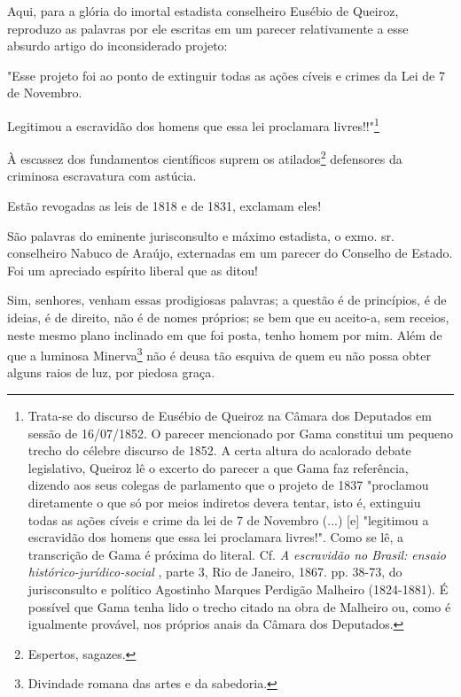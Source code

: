 Aqui, para a glória do imortal estadista conselheiro Eusébio de Queiroz,
reproduzo as palavras por ele escritas em um parecer relativamente a
esse absurdo artigo do inconsiderado projeto:

"Esse projeto foi ao ponto de extinguir todas as ações cíveis e crimes
da Lei de 7 de Novembro.

Legitimou a escravidão dos homens que essa lei proclamara
livres!!"\footnote{Trata-se do discurso de Eusébio de Queiroz na
  Câmara dos Deputados em sessão de 16/07/1852. O parecer mencionado por
  Gama constitui um pequeno trecho do célebre discurso de 1852. A certa
  altura do acalorado debate legislativo, Queiroz lê o excerto do
  parecer a que Gama faz referência, dizendo aos seus colegas de
  parlamento que o projeto de 1837 "proclamou diretamente o que só por
  meios indiretos devera tentar, isto é, extinguiu todas as ações cíveis
  e crime da lei de 7 de Novembro (...) {[}e{]} "legitimou a escravidão
  dos homens que essa lei proclamara livres!". Como se lê, a transcrição
  de Gama é próxima do literal. Cf. \emph{A escravidão no Brasil: ensaio
  histórico-jurídico-social} , parte 3, Rio de Janeiro, 1867. pp. 38-73,
  do jurisconsulto e político Agostinho Marques Perdigão Malheiro
  (1824-1881). É possível que Gama tenha lido o trecho citado na obra de
  Malheiro ou, como é igualmente provável, nos próprios anais da Câmara
  dos Deputados.}

À escassez dos fundamentos científicos suprem os atilados\footnote{
  Espertos, sagazes.} defensores da criminosa escravatura com astúcia.

Estão revogadas as leis de 1818 e de 1831, exclamam eles!

São palavras do eminente jurisconsulto e máximo estadista, o exmo. sr.
conselheiro Nabuco de Araújo, externadas em um parecer do Conselho de
Estado. Foi um apreciado espírito liberal que as ditou!

Sim, senhores, venham essas prodigiosas palavras; a questão é de
princípios, é de ideias, é de direito, não é de nomes próprios; se bem
que eu aceito-a, sem receios, neste mesmo plano inclinado em que foi
posta, tenho homem por mim. Além de que a luminosa Minerva\footnote{
  Divindade romana das artes e da sabedoria.} não é deusa tão esquiva de
quem eu não possa obter alguns raios de luz, por piedosa graça.

